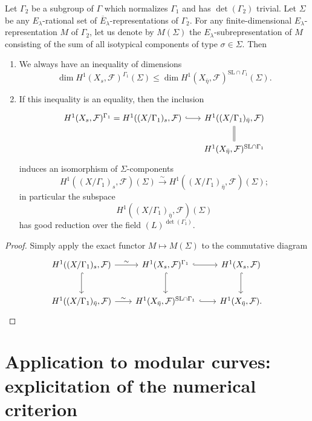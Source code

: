 \begin{corollary}\label{cor:14.2.5}
Let $\Gamma_2$ be a subgroup of $\Gamma$ which normalizes $\Gamma_1$ and has $\det(\Gamma_2)$ trivial. Let $\Sigma$ be any $E_\lambda$-rational set of $\overline{E}_\lambda$-representations of $\Gamma_2$. For any finite-dimensional $E_\lambda$-representation $M$ of $\Gamma_2$, let us denote by $M(\Sigma)$ the $E_\lambda$-subrepresentation of $M$ consisting of the sum of all isotypical components of type $\sigma \in \Sigma$. Then
\begin{enumerate}[label=\arabic*)]
\item We always have an inequality of dimensions
\[
\dim H^1(X_s, \mathcal{F})^{\Gamma_1}(\Sigma) \le \dim H^1(X_{\bar{\eta}}, \mathcal{F})^{\mathrm{SL} \cap \Gamma_1}(\Sigma) .
\]
\item If this inequality is an equality, then the inclusion
\[
\begin{tikzcd}[row sep=1.8em, column sep=1.8em]
H^1(X_s, \mathcal{F})^{\Gamma_1} = H^1((X/\Gamma_1)_s, \mathcal{F}) \arrow[r, hook] & H^1((X/\Gamma_1)_{\bar{\eta}}, \mathcal{F}) \arrow[d, equal] \\
& H^1(X_{\bar{\eta}}, \mathcal{F})^{\mathrm{SL} \cap \Gamma_1}
\end{tikzcd}
\]
induces an isomorphism of $\Sigma$-components
\[
H^1((X/\Gamma_1)_s, \mathcal{F})(\Sigma) \xrightarrow{\ \sim\ } H^1((X/\Gamma_1)_{\bar{\eta}}, \mathcal{F})(\Sigma) ;
\]
in particular the subspace
\[
H^1((X/\Gamma_1)_{\bar{\eta}}, \mathcal{F})(\Sigma)
\]
has good reduction over the field $(L)^{\det(\Gamma_1)}$.
\end{enumerate}
\end{corollary}

\begin{proof}
Simply apply the exact functor $M \mapsto M(\Sigma)$ to the commutative diagram
\[
\begin{tikzcd}[row sep=2.5em, column sep=2em]
H^1((X/\Gamma_1)_s, \mathcal{F}) \arrow[r, "\sim"] \arrow[d, hook] & H^1(X_s, \mathcal{F})^{\Gamma_1} \arrow[r, hook] \arrow[d, hook] & H^1(X_s, \mathcal{F}) \arrow[d, hook] \\
H^1((X/\Gamma_1)_{\bar{\eta}}, \mathcal{F}) \arrow[r, "\sim"] & H^1(X_{\bar{\eta}}, \mathcal{F})^{\mathrm{SL} \cap \Gamma_1} \arrow[r, hook] & H^1(X_{\bar{\eta}}, \mathcal{F}) . \qedhere
\end{tikzcd}
\]
\end{proof}

\section{Application to modular curves: explicitation of the numerical criterion}
\label{sec:14.3}

